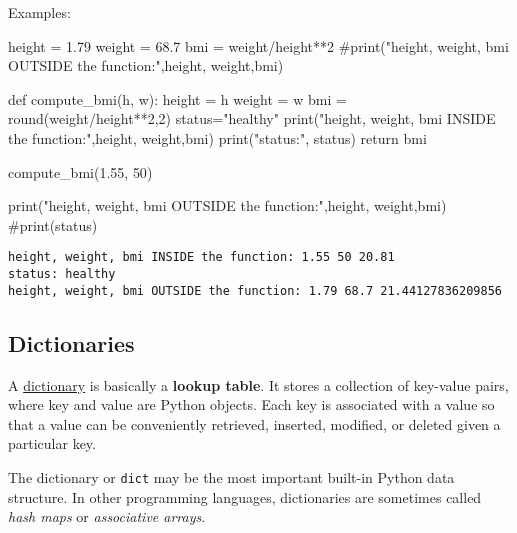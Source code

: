 \documentclass[
  letterpaper,
  DIV=11,
  numbers=noendperiod]{scrreprt}
\newenvironment{Shaded}{\begin{snugshade}}{\end{snugshade}}
\newcommand{\BuiltInTok}[1]{\textcolor[rgb]{0.00,0.23,0.31}{#1}}
\newcommand{\CommentTok}[1]{\textcolor[rgb]{0.37,0.37,0.37}{#1}}
\newcommand{\ControlFlowTok}[1]{\textcolor[rgb]{0.00,0.23,0.31}{#1}}
\newcommand{\DecValTok}[1]{\textcolor[rgb]{0.68,0.00,0.00}{#1}}
\newcommand{\FloatTok}[1]{\textcolor[rgb]{0.68,0.00,0.00}{#1}}
\newcommand{\KeywordTok}[1]{\textcolor[rgb]{0.00,0.23,0.31}{#1}}
\newcommand{\NormalTok}[1]{\textcolor[rgb]{0.00,0.23,0.31}{#1}}
\newcommand{\OperatorTok}[1]{\textcolor[rgb]{0.37,0.37,0.37}{#1}}
\newcommand{\StringTok}[1]{\textcolor[rgb]{0.13,0.47,0.30}{#1}}
\begin{document}
Examples:

\begin{Shaded}
\begin{Highlighting}[]
\NormalTok{height }\OperatorTok{=} \FloatTok{1.79}
\NormalTok{weight }\OperatorTok{=} \FloatTok{68.7}
\NormalTok{bmi }\OperatorTok{=}\NormalTok{ weight}\OperatorTok{/}\NormalTok{height}\OperatorTok{**}\DecValTok{2}
\CommentTok{\#print("height, weight, bmi OUTSIDE the function:",height, weight,bmi)}

\KeywordTok{def}\NormalTok{ compute\_bmi(h, w):}
\NormalTok{    height }\OperatorTok{=}\NormalTok{ h}
\NormalTok{    weight }\OperatorTok{=}\NormalTok{ w}
\NormalTok{    bmi }\OperatorTok{=} \BuiltInTok{round}\NormalTok{(weight}\OperatorTok{/}\NormalTok{height}\OperatorTok{**}\DecValTok{2}\NormalTok{,}\DecValTok{2}\NormalTok{)}
\NormalTok{    status}\OperatorTok{=}\StringTok{"healthy"}
    \BuiltInTok{print}\NormalTok{(}\StringTok{"height, weight, bmi INSIDE the function:"}\NormalTok{,height, weight,bmi)}
    \BuiltInTok{print}\NormalTok{(}\StringTok{"status:"}\NormalTok{, status)}
    \ControlFlowTok{return}\NormalTok{ bmi}

\NormalTok{compute\_bmi(}\FloatTok{1.55}\NormalTok{, }\DecValTok{50}\NormalTok{)}

\BuiltInTok{print}\NormalTok{(}\StringTok{"height, weight, bmi OUTSIDE the function:"}\NormalTok{,height, weight,bmi)}
\CommentTok{\#print(status)}
\end{Highlighting}
\end{Shaded}

\begin{verbatim}
height, weight, bmi INSIDE the function: 1.55 50 20.81
status: healthy
height, weight, bmi OUTSIDE the function: 1.79 68.7 21.44127836209856
\end{verbatim}

\hypertarget{dictionaries}{%
\subsection{Dictionaries}\label{dictionaries}}

A
\href{https://wesmckinney.com/book/python-builtin.html\#dict}{dictionary}
is basically a \textbf{lookup table}. It stores a collection of
key-value pairs, where key and value are Python objects. Each key is
associated with a value so that a value can be conveniently retrieved,
inserted, modified, or deleted given a particular key.

The dictionary or \texttt{dict} may be the most important built-in
Python data structure. In other programming languages, dictionaries are
sometimes called \emph{hash maps} or \emph{associative arrays}.
\end{document}
